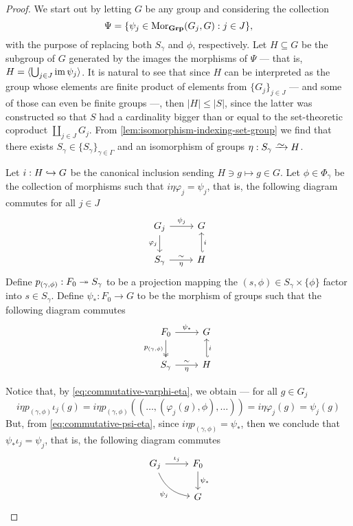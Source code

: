 \begin{proof}
We start out by letting \(G\) be any group and considering the collection
\[
  \Psi = \{\psi_{j} \in \operatorname{Mor}_{{\textbf{Grp}}}(G_j, G) : j \in J\},
\]
with the purpose of replacing both \(S_{\gamma}\) and \(\phi\),
respectively. Let \(H \subseteq G\) be the subgroup of \(G\) generated by the
images the morphisms of \(\Psi\) --- that is, \(H = \langle \bigcup_{j \in J}
\operatorname{im} \psi_j \rangle\). It is natural to see that since \(H\) can be interpreted
as the group whose elements are finite product of elements from \(\{G_{j}\}_{j
\in J}\) --- and some of those can even be finite groups ---, then \(|H| \leq
|S|\), since the latter was constructed so that \(S\) had a cardinality bigger
than or equal to the set-theoretic coproduct \(\coprod_{j \in J} G_j\). From
\cref{lem:isomorphism-indexing-set-group} we find that there exists \(S_{\gamma}
\in \{S_{\gamma}\}_{\gamma \in \Gamma}\) and an isomorphism of groups \(\eta:
S_{\gamma} \isoto H\).

Let \(i: H \hookrightarrow G\) be the canonical inclusion sending \(H \ni g \mapsto g \in
G\). Let \(\phi \in \Phi_{\gamma}\) be the collection of morphisms such that \(i
\eta \varphi_j = \psi_j\), that is, the following diagram commutes for all \(j
\in J\)
\begin{equation*}
\label{eq:commutative-varphi-eta}
  \begin{tikzcd}
    G_j \ar[r, "\psi_j"] \ar[d, swap, "\varphi_j"] &G \\
    S_{\gamma} \ar[r, "\eta"', "\sim"] &H \ar[u, hook', swap, "i"]
  \end{tikzcd}
\end{equation*}
Define \(p_{(\gamma, \phi)}: F_0 \twoheadrightarrow S_{\gamma}\) to be a projection mapping
the \((s, \phi) \in S_{\gamma} \times \{\phi\}\) factor into \(s \in
S_{\gamma}\). Define \(\psi_{*}: F_0 \to G\) to be the morphism of groups such
that the following diagram commutes
\begin{equation*}
\label{eq:commutative-psi-eta}
  \begin{tikzcd}
    F_0 \ar[d, two heads, swap, "p_{(\gamma, \phi)}"] \ar[r, "\psi_{*}"] &G \\
    S_{\gamma} \ar[r, "\sim", "\eta"'] &H \ar[u, hook', "i"']
  \end{tikzcd}
\end{equation*}

Notice that, by \cref{eq:commutative-varphi-eta}, we obtain --- for all \(g \in
G_j\)
\[
  i \eta p_{(\gamma, \phi)} \iota_j(g)
  = i \eta p_{(\gamma, \phi)}((\dots, (\varphi_j(g), \phi), \dots))
  = i \eta \varphi_j(g)
  = \psi_j(g)
\]
But, from \cref{eq:commutative-psi-eta}, since \(i \eta p_{(\gamma, \phi)} =
\psi_{*}\), then we conclude that \(\psi_{*} \iota_j = \psi_j\), that is, the
following diagram commutes
\[
  \begin{tikzcd}
    G_j \ar[r, "\iota_j"] \ar[dr, bend right, swap, "\psi_j"]
      &F_0 \ar[d, "\psi_{*}"] \\
    &G
  \end{tikzcd}
\]


\end{proof}
